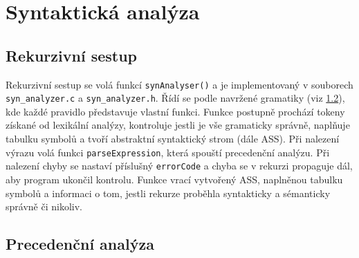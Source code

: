 \documentclass[a4paper, 12pt]{article}
\begin{document}
    \section{Syntaktická analýza}
    
    \subsection{Rekurzivní sestup} \label{sestup}
        Rekurzivní sestup se volá funkcí \texttt{synAnalyser()} a je implementovaný v souborech \texttt{syn\_analyzer.c} a \texttt{syn\_analyzer.h}. Řídí se podle navržené gramatiky (viz \ref{}), kde každé pravidlo představuje vlastní funkci. Funkce postupně prochází tokeny získané od lexikální analýzy, kontroluje jestli je vše gramaticky správně, naplňuje tabulku symbolů a tvoří abstraktní syntaktický strom (dále ASS). Při nalezení výrazu volá funkci \texttt{parseExpression}, která spouští precedenční analýzu. Při nalezení chyby se nastaví příslušný \texttt{errorCode} a chyba se v rekurzi propaguje dál, aby program ukončil kontrolu. Funkce vrací vytvořený ASS, naplněnou tabulku symbolů a informaci o tom, jestli rekurze proběhla syntakticky a sémanticky správně či nikoliv.

    \subsection{Precedenční analýza}
\end{document}
